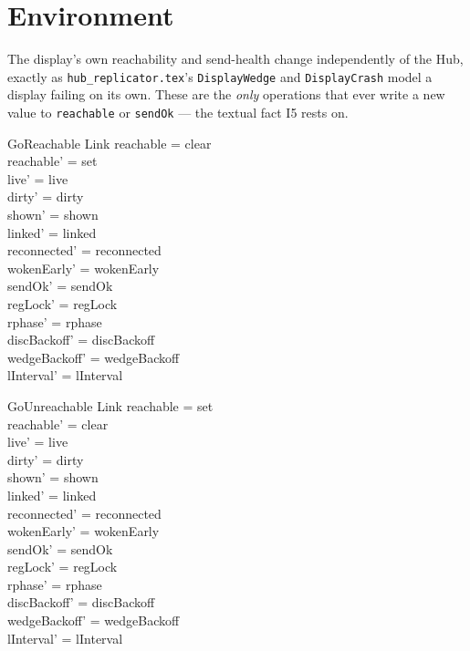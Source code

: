 \documentclass[a4paper,10pt,fleqn]{article}
\begin{document}
\section{Environment}

The display's own reachability and send-health change independently of the
Hub, exactly as \texttt{hub\_replicator.tex}'s \texttt{DisplayWedge} and
\texttt{DisplayCrash} model a display failing on its own.  These are the
\emph{only} operations that ever write a new value to \texttt{reachable} or
\texttt{sendOk} --- the textual fact I5 rests on.

\begin{schema}{GoReachable}
  \Delta Link
\where
  reachable = clear \\
  reachable' = set \\
  live' = live \\ dirty' = dirty \\ shown' = shown \\
  linked' = linked \\ reconnected' = reconnected \\
  wokenEarly' = wokenEarly \\ sendOk' = sendOk \\
  regLock' = regLock \\ rphase' = rphase \\
  discBackoff' = discBackoff \\ wedgeBackoff' = wedgeBackoff \\
  lInterval' = lInterval
\end{schema}

\begin{schema}{GoUnreachable}
  \Delta Link
\where
  reachable = set \\
  reachable' = clear \\
  live' = live \\ dirty' = dirty \\ shown' = shown \\
  linked' = linked \\ reconnected' = reconnected \\
  wokenEarly' = wokenEarly \\ sendOk' = sendOk \\
  regLock' = regLock \\ rphase' = rphase \\
  discBackoff' = discBackoff \\ wedgeBackoff' = wedgeBackoff \\
  lInterval' = lInterval
\end{schema}
\end{document}
